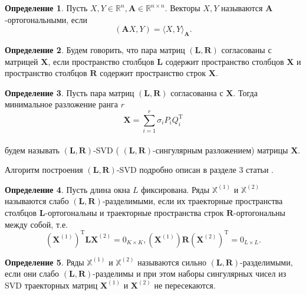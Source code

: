 \documentclass[specialist, substylefile = spbureport.rtx, subf,href,colorlinks=true, 12pt]{disser}
\theoremstyle{definition}
\newtheorem{definition}{Определение}
\begin{document}
\begin{definition}
    Пусть $X, Y \in \mathbb{R}^n, \mathbf{A} \in \mathbb{R}^{n \times n}$. Векторы $X, Y$ называются $\mathbf{A}$-ортогональными, если
    \begin{equation*}
        (\mathbf{A}X, Y) =  \langle X, Y\rangle _{\mathbf{A}}.
    \end{equation*}
\end{definition}
\begin{definition}
    Будем говорить, что пара матриц $(\mathbf{L}, \mathbf{R})$ согласованы с матрицей $\mathbf{X}$, если пространство столбцов $\mathbf{L}$ содержит пространство столбцов $\mathbf{X}$ и пространство столбцов $\mathbf{R}$ содержит пространство строк $\mathbf{X}$.
\end{definition}
\begin{definition}
    Пусть пара матриц $(\mathbf{L}, \mathbf{R})$ согласованна с $\mathbf{X}$. Тогда минимальное разложение ранга $r$
    \begin{equation*}
        \mathbf{X} = \sum_{i = 1}^{r}\sigma_iP_iQ_i^{\mathrm{T}}
    \end{equation*}\\
    будем называть $(\mathbf{L}, \mathbf{R})$-SVD ( $(\mathbf{L}, \mathbf{R})$-сингулярным разложением) матрицы $\mathbf{X}$.
\end{definition}

Алгоритм построения $(\mathbf{L}, \mathbf{R})$-SVD подробно описан в разделе 3 статьи \cite{Golyandina15}.

\begin{definition}
    Пусть длина окна $L$ фиксирована. Ряды $\mathbb{X}^{(1)}$ и $\mathbb{X}^{(2)}$ называются слабо $(\mathbf{L}, \mathbf{R})$-разделимыми, если их траекторные пространства столбцов $\mathbf{L}$-ортогональны и траекторные пространства строк $\mathbf{R}$-ортогональны между собой, т.е.
    \begin{equation*}
        (\mathbf{X}^{(1)})^{\mathrm{T}}\mathbf{LX}^{(2)} = 0_{K \times K}, (\mathbf{X}^{(1)})\mathbf{R}(\mathbf{X}^{(2)})^{\mathrm{T}} = 0_{L \times L}.
    \end{equation*}

\end{definition}
    
\begin{definition}
    Ряды $\mathbb{X}^{(1)}$ и $\mathbb{X}^{(2)}$ называются сильно $(\mathbf{L}, \mathbf{R})$-разделимыми, если они слабо $(\mathbf{L}, \mathbf{R})$-разделимы и при этом наборы сингулярных чисел из SVD траекторных матриц $\mathbf{X}^{(1)}$ и $\mathbf{X}^{(2)}$ не пересекаются.
\end{definition}
\end{document}
